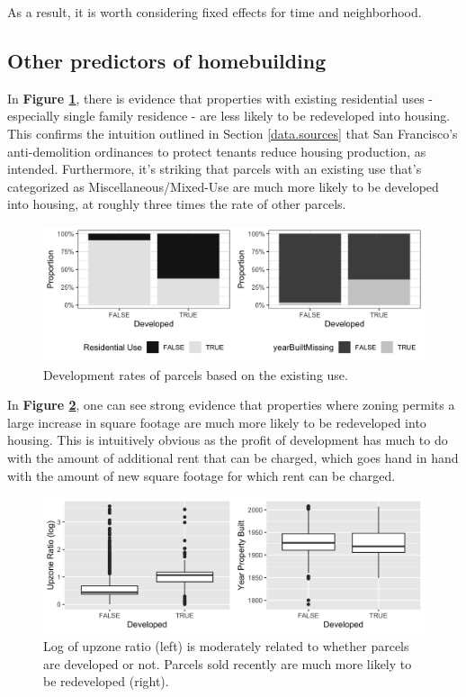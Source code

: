\documentclass[a4paper,12pt]{article}
\begin{document}
As a result, it is worth considering fixed effects for time and neighborhood.

\subsection{Other predictors of homebuilding}
In \textbf{Figure \ref{fig:eda_barplots}}, there is evidence that properties with existing residential uses - especially single family residence - are less likely to be redeveloped into housing. This confirms the intuition outlined in Section \ref{data.sources} that San Francisco's anti-demolition ordinances to protect tenants reduce housing production, as intended. Furthermore, it's striking that parcels with an existing use that's categorized as Miscellaneous/Mixed-Use are much more likely to be developed into housing, at roughly three times the rate of other parcels.

\begin{figure}[hbt]
    \centering
    \includegraphics[scale=.85]{pdev/figures/eda_barplots.png}
    \caption{Development rates of parcels based on the existing use.}
    \label{fig:eda_barplots}
\end{figure}


In \textbf{Figure \ref{fig:eda_boxplots}}, one can see strong evidence that properties where zoning permits a large increase in square footage are much more likely to be redeveloped into housing. This is intuitively obvious as the profit of development has much to do with the amount of additional rent that can be charged, which goes hand in hand with the amount of new square footage for which rent can be charged.

\begin{figure}[hbt]
    \centering
    \includegraphics[scale=.8]{pdev/figures/eda_boxplots.png}
    \caption{Log of upzone ratio (left) is moderately related to whether parcels are developed or not. Parcels sold recently are much more likely to be redeveloped (right).}
    \label{fig:eda_boxplots}
\end{figure}
\end{document}
